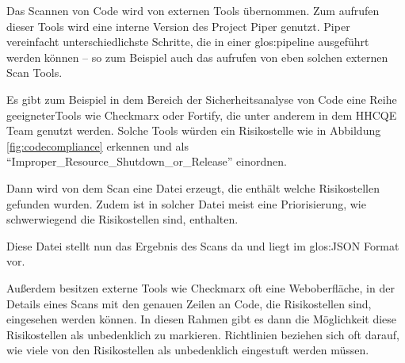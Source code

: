 \documentclass[../main.tex]{subfiles}
\begin{document}
Das Scannen von Code wird von externen Tools übernommen.
Zum aufrufen dieser Tools wird eine interne Version des Project Piper genutzt. Piper vereinfacht unterschiedlichste Schritte, die in einer \gls{glos:pipeline} ausgeführt werden können -- so zum Beispiel auch das aufrufen von eben solchen externen Scan Tools. 

Es gibt zum Beispiel in dem Bereich der Sicherheitsanalyse von Code eine Reihe geeigneterTools wie Checkmarx oder Fortify, die unter anderem in dem \gls{HHCQE} Team genutzt werden.
\cite{SASTTools}
Solche Tools würden ein Risikostelle wie in Abbildung \ref{fig:codecompliance} erkennen und als \enquote{Improper\_Resource\_Shutdown\_or\_Release} einordnen.
\cite{SecurityVulnerabilities}

Dann wird von dem Scan eine Datei erzeugt, die enthält welche Risikostellen gefunden wurden.
Zudem ist in solcher Datei meist eine Priorisierung, wie schwerwiegend die Risikostellen sind, enthalten.

Diese Datei stellt nun das Ergebnis des Scans da und liegt im \gls{glos:JSON} Format vor.

Außerdem besitzen externe Tools wie Checkmarx oft eine Weboberfläche, in der Details eines Scans mit den genauen Zeilen an Code, die Risikostellen sind, eingesehen werden können.
In diesen Rahmen gibt es dann die Möglichkeit diese Risikostellen als unbedenklich zu markieren.
Richtlinien beziehen sich oft darauf, wie viele von den Risikostellen als unbedenklich eingestuft werden müssen.
\end{document}
